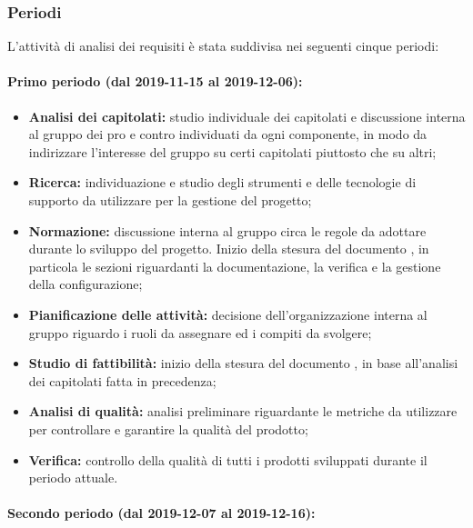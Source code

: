 		\subsubsection{Periodi}
		
			L'attività di analisi dei requisiti è stata suddivisa nei seguenti cinque periodi:
			
			\paragraph{Primo periodo (dal 2019-11-15 al 2019-12-06):}
			
				\begin{itemize}
					\item \textbf{Analisi dei capitolati:} studio individuale dei capitolati e discussione interna al gruppo dei pro e contro individuati da ogni componente, in modo da indirizzare l'interesse del gruppo su certi capitolati piuttosto che su altri;
					\item \textbf{Ricerca:} individuazione e studio degli strumenti e delle tecnologie di supporto da utilizzare per la gestione del progetto;
					\item \textbf{Normazione:} discussione interna al gruppo circa le regole da adottare durante lo sviluppo del progetto. Inizio della stesura del documento , in particola le sezioni riguardanti la documentazione, la verifica e la gestione della configurazione;
					\item \textbf{Pianificazione delle attività:} decisione dell'organizzazione interna al gruppo riguardo i ruoli da assegnare ed i compiti da svolgere;
					\item \textbf{Studio di fattibilità:} inizio della stesura del documento , in base all'analisi dei capitolati fatta in precedenza;
					\item \textbf{Analisi di qualità:} analisi preliminare riguardante le metriche da utilizzare per controllare e garantire la qualità del prodotto;
					\item \textbf{Verifica:} controllo della qualità di tutti i prodotti sviluppati durante il periodo attuale.
				\end{itemize}
			
			\paragraph{Secondo periodo (dal 2019-12-07 al 2019-12-16):}
			
